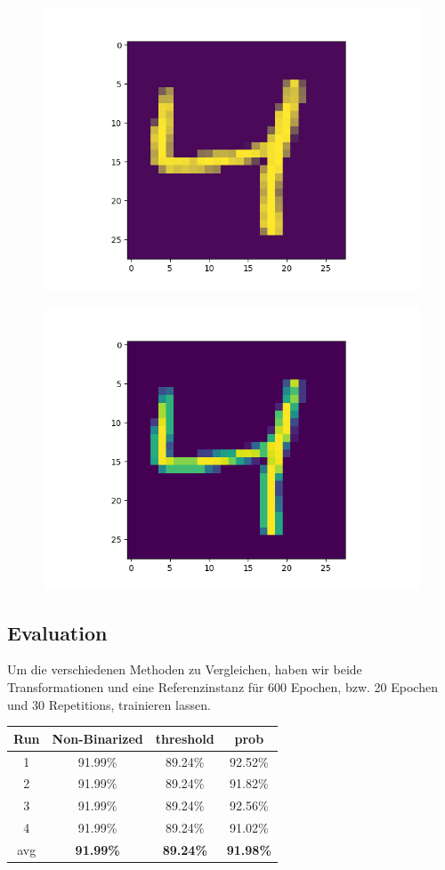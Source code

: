 \begin{figure}[h]
\centering
\begin{minipage}{.5\textwidth}
  \centering
  \includegraphics[width=.4\linewidth]{./bilder/comparison/overlapped}
  \label{fig:bin3}
\end{minipage}%
\begin{minipage}{.5\textwidth}
  \centering
  \includegraphics[width=.4\linewidth]{./bilder/comparison/default}
  \label{fig:dflt}
\end{minipage}
\end{figure}

\subsection{Evaluation}

Um die verschiedenen Methoden zu Vergleichen, haben wir beide Transformationen und eine Referenzinstanz für $600$ Epochen, bzw. 20 Epochen und 30 Repetitions, trainieren lassen.\\

	
	\begin{tabular}{|c|c|c|c|}\hline
		\centering
		Run & Non-Binarized    & threshold        & prob              \\\hline
		1   	& 91.99\%          & 89.24\%          & 92.52\%           \\\hline
		2   & 91.99\%          & 89.24\%          & 91.82\%           \\\hline
		3   & 91.99\%          & 89.24\%          & 92.56\%           \\\hline
		4   & 91.99\%          & 89.24\%          & 91.02\%           \\\hline
		avg & \textbf{91.99\%} & \textbf{89.24\%} & \textbf{91.98\%}  \\\hline
	\end{tabular}
	\label{fig:grph}

